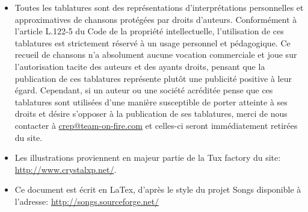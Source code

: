 \vspace{1cm}

\begin{itemize}
\item Toutes les tablatures sont des représentations d'interprétations
  personnelles et approximatives de chansons protégées par droits
  d'auteurs. Conformément à l'article L.122-5 du Code de la propriété
  intellectuelle, l'utilisation de ces tablatures est strictement
  réservé à un usage personnel et pédagogique. Ce recueil de chansons
  n'a absolument aucune vocation commerciale et joue sur
  l'autorisation tacite des auteurs et des ayants droits, pensant que
  la publication de ces tablatures représente plutôt une publicité
  positive à leur égard. Cependant, si un auteur ou une société
  acréditée pense que ces tablatures sont utilisées d'une manière
  susceptible de porter atteinte à ses droits et désire s'opposer à la
  publication de ses tablatures, merci de nous contacter à
  \url{crep@team-on-fire.com} et celles-ci seront immédiatement
  retirées du site.
\item Les illustrations proviennent en majeur partie de la Tux factory
  du site: \url{http://www.crystalxp.net/}.
\item Ce document est écrit en LaTex, d'après le style du projet Songs
  disponible à l'adresse: \url{http://songs.sourceforge.net/}
\end{itemize}

\vspace{1cm}
